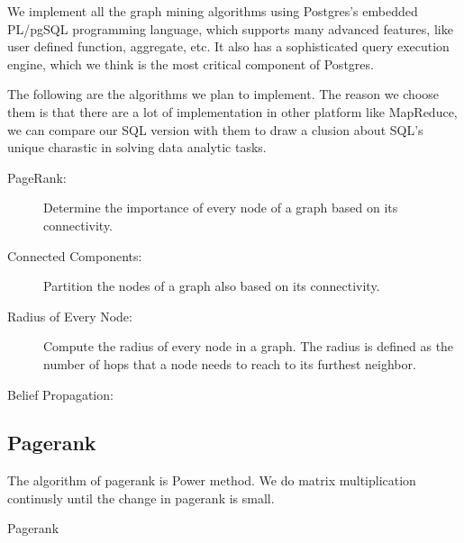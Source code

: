 We implement all the graph mining algorithms using Postgres's embedded PL/pgSQL programming language, which supports many advanced features, like user defined function, aggregate, etc. It also has a sophisticated query execution engine, which we think is the most critical component of Postgres.

The following are the algorithms we plan to implement. The reason we choose them is that there are a lot of implementation in other platform like MapReduce, we can compare our SQL version with them to draw a clusion about SQL's unique charastic in solving data analytic tasks.

\begin{description}
  \item[PageRank:] Determine the importance of every node of a graph based on its connectivity. 
  \item[Connected Components:] Partition the nodes of a graph also based on its connectivity.
  \item[Radius of Every Node:] Compute the radius of every node in a graph. The radius is defined as the number of hops that a node needs to reach to its furthest neighbor.
  \item[Belief Propagation:]
\end{description}

\subsection{Pagerank}
The algorithm of pagerank is Power method. We do matrix multiplication continusly until the change in pagerank is small. 
\begin{algorithm}
\caption{Pagerank}
\begin{algorithmic}
\REPEAT
{}
\end{algorithmic}
\end{algorithm}

